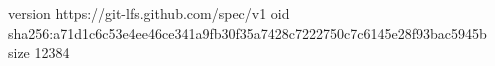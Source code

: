 version https://git-lfs.github.com/spec/v1
oid sha256:a71d1c6c53e4ee46ce341a9fb30f35a7428c7222750c7c6145e28f93bac5945b
size 12384
